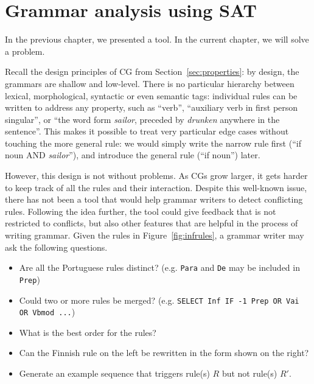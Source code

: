 \def\newcite#1{\cite{#1}}

\def\noun{\textsc{N}}
\def\verb{\textsc{V}}
\def\sg{\textsc{Sg}}
\def\pl{\textsc{Pl}}
\def\detdef{\textsc{DetDef}}


\chapter{Grammar analysis using SAT}
\label{chapterCGana}


In the previous chapter, we presented a tool.
In the current chapter, we will solve a problem.




Recall the design principles of CG from Section~\ref{sec:properties}: 
by design, the grammars are shallow and low-level.
There is no particular hierarchy between lexical, morphological,
syntactic or even semantic tags: individual rules can be written to address any
property, such as ``verb'', ``auxiliary verb in first person singular'',
or ``the word form \emph{sailor}, preceded by \emph{drunken} anywhere in the
sentence''. This makes it possible to treat very particular edge
cases without touching the more general rule: we would simply write
the narrow rule first (``if noun AND \emph{sailor}''), and introduce
the general rule (``if noun'') later.


However, this design is not without problems. As CGs grow larger, it
gets harder to keep track of all the rules and their interaction.
Despite this well-known issue, there has not been a tool that would help 
grammar writers to detect conflicting rules.
Following the idea further, the tool could give feedback that is not 
restricted to conflicts, but also other features that are helpful 
in the process of writing grammar.
Given the rules in Figure~\ref{fig:infrules}, a grammar writer may 
ask the following questions.



\begin{itemize}
\item Are all the Portuguese rules distinct? (e.g. \texttt{Para} and \texttt{De} may be included in \texttt{Prep})
\item Could two or more rules be merged? (e.g. \texttt{SELECT Inf IF -1 Prep OR Vai OR Vbmod ...})
\item What is the best order for the rules?
\item Can the Finnish rule on the left be rewritten in the form shown on the right?
\item Generate an example sequence that triggers rule(s) $R$ but not rule(s) $R'$. 
\end{itemize}

